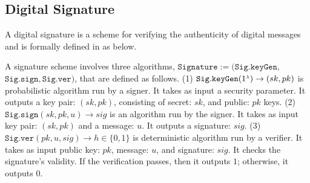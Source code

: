 













\subsection{Digital Signature}\label{subsec:DS}

A digital signature is a scheme for verifying the authenticity of digital messages and is formally defined in \cite{DBLP:books/crc/KatzLindell2014}  as below.
%
%
\begin{definition}\label{sec::def}
A signature scheme  involves three algorithms, $\mathtt{Signature}:=(\mathtt{Sig.keyGen}, $ $\mathtt{Sig.sign}, \mathtt{Sig.ver})$, that are defined as follows. (1) $\mathtt{Sig.keyGen}(1^{\scriptscriptstyle \lambda})\rightarrow (sk,pk)$ is probabilistic algorithm run by  a  signer. It takes as input a security parameter. It outputs a key pair: $(sk,pk)$, consisting of secret: $sk$, and public: $pk$ keys. (2) $\mathtt{Sig.sign}(sk, pk, u)\rightarrow sig$ is an algorithm run by the signer. It takes as input  key pair: $(sk,pk)$ and a message: $u$. It outputs a signature: $sig$. (3) $\mathtt{Sig.ver}( pk, u, sig)\rightarrow h\in\{0,1\}$ is  deterministic algorithm run by a verifier. It takes as input  public key: $pk$,  message: $u$, and signature: $sig$. It checks the signature's validity.   If the verification passes, then it outputs $1$; otherwise, it outputs $0$. 
\end{definition}

